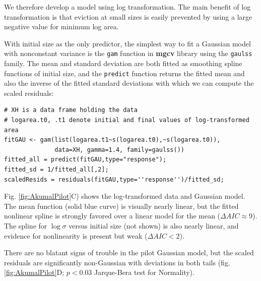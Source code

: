 \documentclass[11pt]{article}
\newcommand{\tom}[2]{{\color{red}{#1}}\footnote{\textit{\color{red}{#2}}}}
\begin{document}
{We therefore develop a model using log transformation. The main benefit of log transformation is that 
eviction at small sizes is easily prevented by using a large negative value for minimum log area. 

With initial size as the only predictor, the simplest way to fit a Gaussian model with nonconstant variance is the
\texttt{gam} function in \textbf{mgcv} library \citep{wood-2017} using the \texttt{gaulss} family. The mean and 
standard deviation are both fitted as smoothing spline functions of initial size, and the \texttt{predict} function
returns the fitted mean and also the inverse of the fitted standard deviations with which we can compute the scaled residuals: 
\begin{lstlisting}
# XH is a data frame holding the data
# logarea.t0, .t1 denote initial and final values of log-transformed area   
fitGAU <- gam(list(logarea.t1~s(logarea.t0),~s(logarea.t0)),
              data=XH, gamma=1.4, family=gaulss())
fitted_all = predict(fitGAU,type="response"); 
fitted_sd = 1/fitted_all[,2]; 
scaledResids = residuals(fitGAU,type=''response'')/fitted_sd;  
\end{lstlisting}
Fig. \ref{fig:AkumalPilot}C) shows the log-transformed data and Gaussian model. The mean function (solid blue curve) 
is visually nearly linear, but the fitted nonlinear spline is strongly favored over a linear model for the mean ($\Delta AIC \approx 9$). 
The spline for $\log \sigma$ versus initial size (not shown) is also nearly linear, and evidence for nonlinearity is present but 
weak ($\Delta AIC <2$). 

There are no blatant signs of trouble in the pilot Gaussian model, but the scaled residuals are 
significantly non-Gaussian with deviations in both tails (fig. \ref{fig:AkumalPilot}D; $p<0.03$ Jarque-Bera test for Normality).

}
\end{document}
